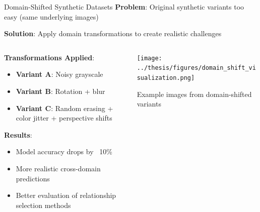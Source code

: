 \documentclass[aspectratio=169]{beamer}
\begin{document}
\begin{frame}{Domain-Shifted Synthetic Datasets}
    \textbf{Problem}: Original synthetic variants too easy (same underlying images)

    \vspace{0.5em}

    \textbf{Solution}: Apply domain transformations to create realistic challenges

    \begin{columns}[T]
        \begin{column}{0.6\textwidth}
            \textbf{Transformations Applied}:
            \begin{itemize}
                \item \textbf{Variant A}: Noisy grayscale
                \item \textbf{Variant B}: Rotation + blur
                \item \textbf{Variant C}: Random erasing + color jitter + perspective shifts
            \end{itemize}

            \vspace{1em}

            \textbf{Results}:
            \begin{itemize}
                \item Model accuracy drops by ~10\%
                \item More realistic cross-domain predictions
                \item Better evaluation of relationship selection methods
            \end{itemize}
        \end{column}

        \begin{column}{0.35\textwidth}
            \begin{center}
                \texttt{[image: ../thesis/figures/domain\_shift\_visualization.png]}
            \end{center}
            \small{Example images from domain-shifted variants}
        \end{column}
    \end{columns}
\end{frame}
\end{document}
